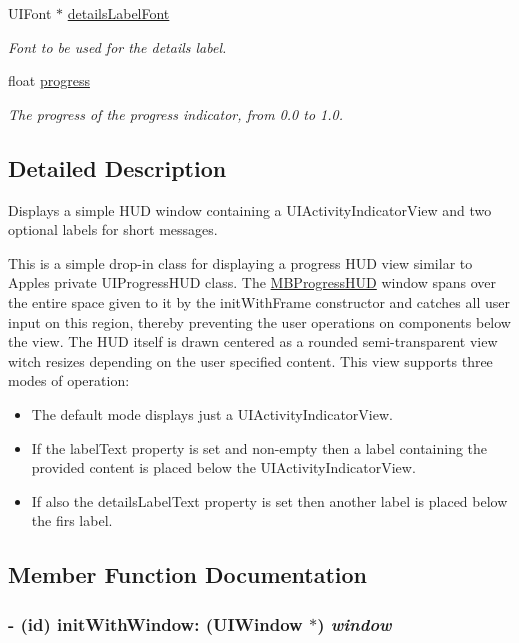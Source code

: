\begin{CompactItemize}
UIFont $\ast$ \hyperlink{interface_m_b_progress_h_u_d_f3a772e02286bf867c2b4c2213be0180}{detailsLabelFont}
\begin{CompactList}\small\item\em Font to be used for the details label. \item\end{CompactList}\item 
float \hyperlink{interface_m_b_progress_h_u_d_4c8328617d11efd1f5452032246ca97f}{progress}
\begin{CompactList}\small\item\em The progress of the progress indicator, from 0.0 to 1.0. \item\end{CompactList}\end{CompactItemize}


\subsection{Detailed Description}
Displays a simple HUD window containing a UIActivityIndicatorView and two optional labels for short messages. 

This is a simple drop-in class for displaying a progress HUD view similar to Apples private UIProgressHUD class. The \hyperlink{interface_m_b_progress_h_u_d}{MBProgressHUD} window spans over the entire space given to it by the initWithFrame constructor and catches all user input on this region, thereby preventing the user operations on components below the view. The HUD itself is drawn centered as a rounded semi-transparent view witch resizes depending on the user specified content. This view supports three modes of operation:\begin{itemize}
\item The default mode displays just a UIActivityIndicatorView.\item If the labelText property is set and non-empty then a label containing the provided content is placed below the UIActivityIndicatorView.\item If also the detailsLabelText property is set then another label is placed below the firs label. \end{itemize}


\subsection{Member Function Documentation}
\hypertarget{interface_m_b_progress_h_u_d_8f3c01167d59153c85ae7efdca7717fc}{
\subsubsection[{initWithWindow:}]{\setlength{\rightskip}{0pt plus 5cm}- (id) initWithWindow: (UIWindow $\ast$) {\em window}}}
\label{interface_m_b_progress_h_u_d_8f3c01167d59153c85ae7efdca7717fc}


